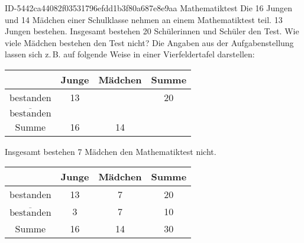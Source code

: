 \begin{exercise}
      {ID-5442ca44082f03531796efdd1b3f80a687e8e9aa}
      {Mathematiktest}
  \ifproblem\problem
    Die 16 Jungen und 14 Mädchen einer Schulklasse nehmen an einem
    Mathematiktest teil. 13 Jungen bestehen. Insgesamt bestehen 20
    Schülerinnen und Schüler den Test. Wie viele Mädchen bestehen den
    Test nicht?
  \fi
  \ifoutline\outline
    Die Angaben aus der Aufgabenstellung lassen sich z.\,B. auf folgende
    Weise in einer Vierfeldertafel darstellen:
    \begin{center}
      \newcommand{\attribApos}{Junge}%
      \newcommand{\attribAneg}{Mädchen}%
      \newcommand{\attribBpos}{bestanden}%
      \newcommand{\attribBneg}{$\overline{\text{bestanden}}$}%
      \renewcommand{\arraystretch}{1.25}%
      \begin{tabular}{|c||c|c||c|}
        \hline
                    & \attribApos & \attribAneg & Summe \\
        \hline
        \hline
        \attribBpos & 13          &             & 20    \\
        \hline
        \attribBneg &             &             &       \\
        \hline
        \hline
        Summe       & 16          & 14          &       \\
        \hline
      \end{tabular}%
    \end{center}
  \fi
  \ifoutcome\outcome
    Insgesamt bestehen 7 Mädchen den Mathematiktest nicht.
    \begin{center}
      \newcommand{\attribApos}{Junge}%
      \newcommand{\attribAneg}{Mädchen}%
      \newcommand{\attribBpos}{bestanden}%
      \newcommand{\attribBneg}{$\overline{\text{bestanden}}$}%
      \renewcommand{\arraystretch}{1.25}%
      \begin{tabular}{|c||c|c||c|}
        \hline
                    & \attribApos & \attribAneg & Summe \\
        \hline
        \hline
        \attribBpos & 13          & 7           & 20    \\
        \hline
        \attribBneg & 3           & 7           & 10    \\
        \hline
        \hline
        Summe       & 16          & 14          & 30    \\
        \hline
      \end{tabular}%
    \end{center}
  \fi
\end{exercise}
